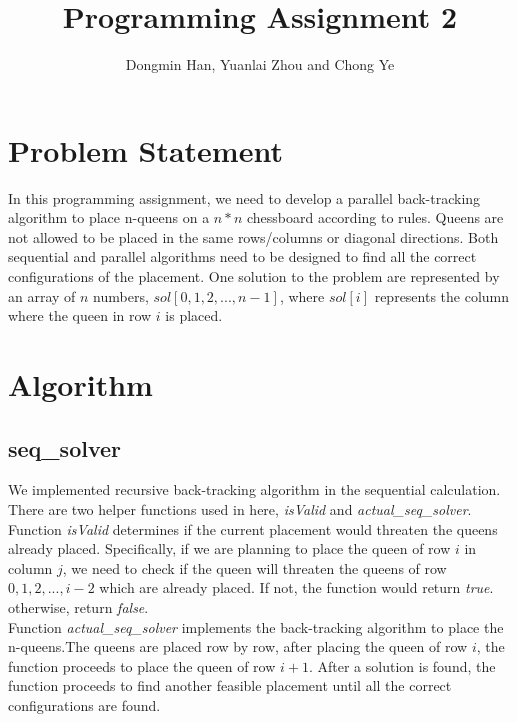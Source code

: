 \documentclass[twoside,12pt]{article}
\title{Programming Assignment 2}
\author{Dongmin Han, Yuanlai Zhou and Chong Ye}
\begin{document}
\maketitle
\section{Problem Statement}
In this programming assignment, we need to develop a parallel back-tracking algorithm to place n-queens on a $ n * n $ chessboard according to rules. Queens are not allowed to be placed in the same rows/columns or diagonal directions. Both sequential and parallel algorithms need to be designed to find all the correct configurations of the placement. One solution to the problem are represented by an array of $ n $ numbers, $ sol[0,1,2,...,n-1] $, where $ sol[i] $ represents the column where the queen in row $ i $ is placed.
\section{Algorithm}


\subsection{seq\_solver}
We implemented recursive back-tracking algorithm in the sequential calculation. There are two helper functions used in here, \textit{isValid} and \textit{actual\_seq\_solver}.\\
Function \textit{isValid} determines if the current placement would threaten the queens already placed. Specifically, if we are planning to place the queen of row $ i $ in column $ j $, we need to check if the queen will threaten the queens of row $ 0,1,2,...,i-2 $ which are already placed. If not, the function would return \textit{true}. otherwise, return \textit{false}. \\
Function \textit{actual\_seq\_solver} implements the back-tracking algorithm to place the n-queens.The queens are placed row by row, after placing the queen of row $ i $, the function proceeds to place the queen of row $ i+1 $. After a solution is found, the function proceeds to find another feasible placement until all the correct configurations are found. 
\end{document}
